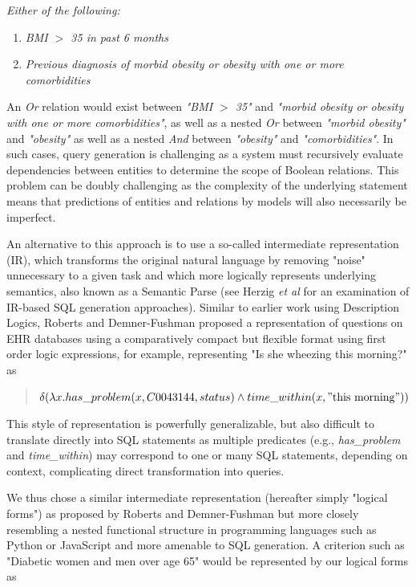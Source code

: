 \documentclass[../main.tex]{subfiles}
\begin{document}
\textit{Either of the following:}
\begin{enumerate}
    \itemsep0em 
    \item \textit{BMI $>$ 35 in past 6 months}
    \item \textit{Previous diagnosis of morbid obesity or obesity with one or more comorbidities}
\end{enumerate}

\noindent An \textit{Or} relation would exist between \textit{"BMI $>$ 35"} and \textit{"morbid obesity or obesity with one or more comorbidities"}, as well as a nested \textit{Or} between \textit{"morbid obesity"} and \textit{"obesity"} as well as a nested \textit{And} between \textit{"obesity"} and \textit{"comorbidities"}. In such cases, query generation is challenging as a system must recursively evaluate dependencies between entities to determine the scope of Boolean relations. This problem can be doubly challenging as the complexity of the underlying statement means that predictions of entities and relations by models will also necessarily be imperfect.

An alternative to this approach is to use a so-called intermediate representation (IR), which transforms the original natural language by removing "noise" unnecessary to a given task and which more logically represents underlying semantics, also known as a Semantic Parse \cite{kamathsurvey} (see Herzig \textit{et al} \cite{herzig2021unlocking} for an examination of IR-based SQL generation approaches). Similar to earlier work using Description Logics, Roberts and Demner-Fushman \cite{roberts2016annotating} proposed a representation of questions on EHR databases using a comparatively compact but flexible format using first order logic expressions, for example, representing "Is she wheezing this morning?" as

\begin{quote}
    \centering
    $\delta( \lambda x.has\_problem(x, C0043144, status) \wedge time\_within(x, \mathrm{"this\ morning"}))$
\end{quote}

\noindent This style of representation is powerfully generalizable, but also difficult to translate directly into SQL statements as multiple predicates (e.g., \textit{has\_problem} and \textit{time\_within}) may correspond to one or many SQL statements, depending on context, complicating direct transformation into queries.

We thus chose a similar intermediate representation (hereafter simply "logical forms") as proposed by Roberts and Demner-Fushman but more closely resembling a nested functional structure in programming languages such as Python or JavaScript and more amenable to SQL generation. A criterion such as "Diabetic women and men over age 65" would be represented by our logical forms as
\end{document}
